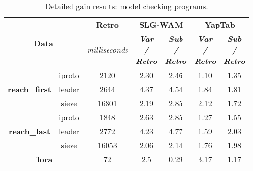 \begin{table}[ht]
\centering
\footnotesize{
  \begin{tabular}{cc|c|cc|cc}
   \hline
    \hline
    \multicolumn{2}{c|}{\multirow{2}{*}{\small{\textbf{Data}}}} & \textbf{\small{Retro}} & \multicolumn{2}{c|}{\small{\textbf{SLG-WAM}}} & \multicolumn{2}{c}{\small{\textbf{YapTab}}} \\
     \multicolumn{2}{c|}{} & \scriptsize{\textit{milliseconds}} & \textbf{\textit{\scriptsize{Var / Retro}}} & \textbf{\textit{\scriptsize{Sub / Retro}}} & \textbf{\textit{\scriptsize{Var / Retro}}} & \textbf{\textit{\scriptsize{Sub / Retro}}} \\
   \hline
   \hline

\multirow{3}{*}{\textbf{reach\_first}} &  iproto &  2120 &  2.30  &  2.46  &  1.10 & 1.35 \\
&  leader &  2644 &  4.37  &  4.54  &  1.84 & 1.81 \\
&  sieve &  16801 &  2.19  &  2.85  &  2.12 & 1.72 \\
\hline
\multirow{3}{*}{\textbf{reach\_last}} &  iproto &  1848 &  2.63  &  2.85  &  1.27 & 1.55 \\
&  leader &  2772 &  4.23  &  4.77  &  1.59 & 2.03 \\
&  sieve &  16053 &  2.06  &  2.14  &  1.76 & 1.98 \\
\hline
\multicolumn{2}{c|}{\textbf{flora}} & 72 & 2.5 & 0.29 & 3.17 & 1.17 \\
\hline
\end{tabular}
}
\caption{Detailed gain results: model checking programs.}
\label{tbl:results_detail_gain_model}
\end{table}